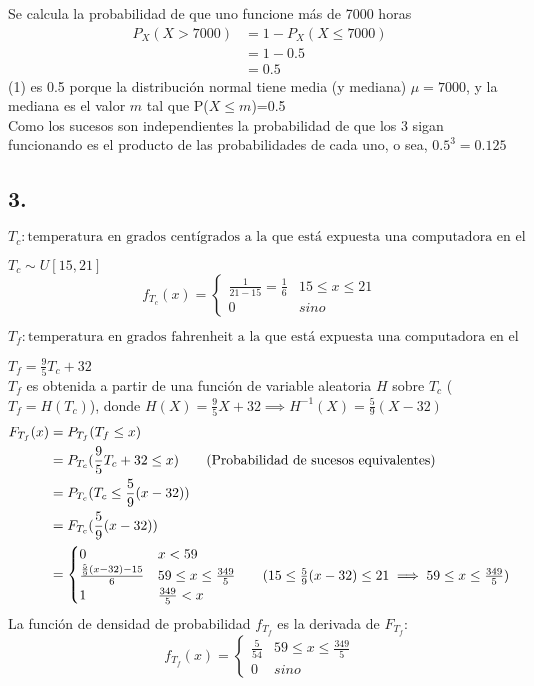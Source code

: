 \documentclass[12pt,fleqn]{article}
\begin{document}
Se calcula la probabilidad de que uno funcione más de 7000 horas
\begin{align*}
  P_X(X>7000)&=1-P_X(X\le 7000)\\
             &=1-0.5\tag{1}\\
             &=0.5
\end{align*}
(1) es 0.5 porque la distribución normal tiene media (y mediana) $\mu=7000$, y la mediana es el valor $m$ tal que P($X\le m$)=0.5\\

Como los sucesos son independientes la probabilidad de que los 3 sigan funcionando es el producto de las probabilidades de cada uno, o sea, $0.5^3=0.125$
\subsection*{3.}
$T_c: \textrm{temperatura en grados centígrados a la que está expuesta una computadora en el campo}$

$T_c \sim U[15,21]$
\[f_{T_c}(x)=\begin{cases}
    \frac{1}{21-15}=\frac{1}{6}&15\le x\le 21\\
    0&sino
  \end{cases}
\]

$T_f: \textrm{temperatura en grados fahrenheit a la que está expuesta una computadora en el campo}$

$T_f=\frac{9}{5}T_c+32$\\

$T_f$ es obtenida a partir de una función de variable aleatoria $H$ sobre $T_c$ ($T_f=H(T_c)$), donde $H(X)=\frac{9}{5}X+32\implies H^{-1}(X)=\frac{5}{9}(X-32)$
\begin{align*}
  F_{T_f}(x)&=P_{T_f}(T_f \le x)\\
            &=P_{T_c}(\frac{9}{5}T_c+32\le x)\tag{Probabilidad de sucesos equivalentes}\\
            &=P_{T_c}(T_c \le \frac{5}{9}(x-32))\\
            &=F_{T_c}(\frac{5}{9}(x-32))\\
            &=\begin{cases}
              0&x<59\\
              \frac{\frac{5}{9}(x-32)-15}{6}&59\le x\le\frac{349}{5}\tag{$15\le \frac{5}{9}(x-32)\le 21\implies 59\le x\le\frac{349}{5}$}\\
              1&\frac{349}{5}<x
              \end{cases}
\end{align*}
La función de densidad de probabilidad $f_{T_f}$ es la derivada de $F_{T_f}$:
\[f_{T_f}(x)=\begin{cases}
    \frac{5}{54}&59\le x\le\frac{349}{5}\\
    0&sino
  \end{cases}
\]
\end{document}
